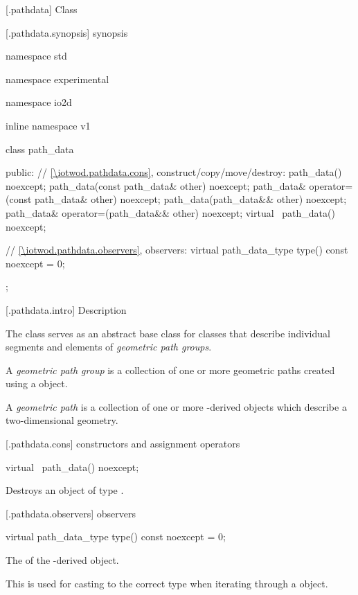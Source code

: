  [\iotwod.pathdata] {Class }

 [\iotwod.pathdata.synopsis] { synopsis}

\begin{codeblock}
namespace std { namespace experimental { namespace io2d { inline namespace v1 {
  class path_data {
  public:
    // \ref{\iotwod.pathdata.cons}, construct/copy/move/destroy:
    path_data() noexcept;
    path_data(const path_data& other) noexcept;
    path_data& operator=(const path_data& other) noexcept;
    path_data(path_data&& other) noexcept;
    path_data& operator=(path_data&& other) noexcept;
    virtual ~path_data() noexcept;

    // \ref{\iotwod.pathdata.observers}, observers:
    virtual path_data_type type() const noexcept = 0;
  };
} } } }
\end{codeblock}

 [\iotwod.pathdata.intro] { Description}

\pnum
{}
The class  serves as an abstract base class for classes that describe individual segments and elements of \textit{geometric path groups}.

\pnum
A \textit{geometric path group} is a collection of one or more geometric paths created using a  object.

\pnum
A \textit{geometric path} is a collection of one or more -derived objects which describe a two-dimensional geometry.

 [\iotwod.pathdata.cons] { constructors and assignment operators}

\begin{itemdecl}
    virtual ~path_data() noexcept;
\end{itemdecl}
\begin{itemdescr}
	\pnum
	\effects
	Destroys an object of type .
	
\end{itemdescr}

 [\iotwod.pathdata.observers]{ observers}

\begin{itemdecl}
    virtual path_data_type type() const noexcept = 0;
\end{itemdecl}
\begin{itemdescr}
	\pnum
	\returns
	The  of the -derived object.
	
	\pnum
	\realnote
	This is used for casting to the correct type when iterating through a  object.
\end{itemdescr}
